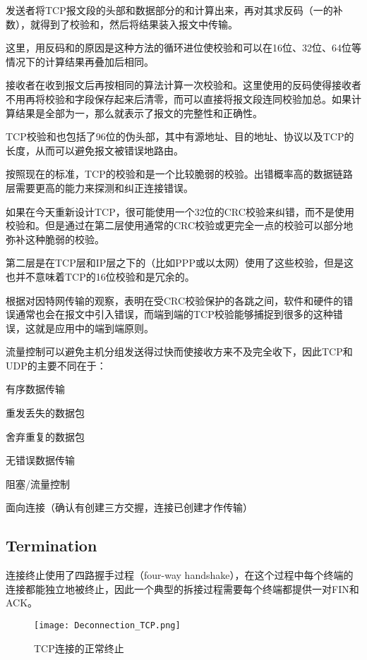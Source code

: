 发送者将TCP报文段的头部和数据部分的和计算出来，再对其求反码（一的补数），就得到了校验和，然后将结果装入报文中传输。

这里，用反码和的原因是这种方法的循环进位使校验和可以在16位、32位、64位等情况下的计算结果再叠加后相同。

接收者在收到报文后再按相同的算法计算一次校验和。这里使用的反码使得接收者不用再将校验和字段保存起来后清零，而可以直接将报文段连同校验加总。如果计算结果是全部为一，那么就表示了报文的完整性和正确性。

TCP校验和也包括了96位的伪头部，其中有源地址、目的地址、协议以及TCP的长度，从而可以避免报文被错误地路由。

按照现在的标准，TCP的校验和是一个比较脆弱的校验。出错概率高的数据链路层需要更高的能力来探测和纠正连接错误。

如果在今天重新设计TCP，很可能使用一个32位的CRC校验来纠错，而不是使用校验和。但是通过在第二层使用通常的CRC校验或更完全一点的校验可以部分地弥补这种脆弱的校验。

第二层是在TCP层和IP层之下的（比如PPP或以太网）使用了这些校验，但是这也并不意味着TCP的16位校验和是冗余的。

根据对因特网传输的观察，表明在受CRC校验保护的各跳之间，软件和硬件的错误通常也会在报文中引入错误，而端到端的TCP校验能够捕捉到很多的这种错误，这就是应用中的端到端原则。

流量控制可以避免主机分组发送得过快而使接收方来不及完全收下，因此TCP和UDP的主要不同在于：

\begin{compactitem}
\item 有序数据传输
\item 重发丢失的数据包
\item 舍弃重复的数据包
\item 无错误数据传输
\item 阻塞/流量控制
\item 面向连接（确认有创建三方交握，连接已创建才作传输）
\end{compactitem}

\subsection{Termination}

连接终止使用了四路握手过程（four-way handshake），在这个过程中每个终端的连接都能独立地被终止，因此一个典型的拆接过程需要每个终端都提供一对FIN和ACK。

\begin{figure}[htbp]
\centering
\texttt{[image: Deconnection\_TCP.png]}
\caption{TCP连接的正常终止}
\end{figure}


